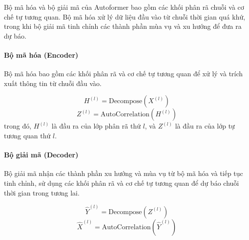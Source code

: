 Bộ mã hóa và bộ giải mã của Autoformer bao gồm các khối phân rã chuỗi và cơ chế tự tương quan. Bộ mã hóa xử lý dữ liệu đầu vào từ chuỗi thời gian quá khứ, trong khi bộ giải mã tinh chỉnh các thành phần mùa vụ và xu hướng để đưa ra dự báo.

\paragraph{Bộ mã hóa (Encoder)}

Bộ mã hóa bao gồm các khối phân rã và cơ chế tự tương quan để xử lý và trích xuất thông tin từ chuỗi đầu vào.

\[
H^{(l)} = \text{Decompose}(X^{(l)})
\]
\[
Z^{(l)} = \text{AutoCorrelation}(H^{(l)})
\]
trong đó, $H^{(l)}$ là đầu ra của lớp phân rã thứ $l$, và $Z^{(l)}$ là đầu ra của lớp tự tương quan thứ $l$.

\paragraph{Bộ giải mã (Decoder)}

Bộ giải mã nhận các thành phần xu hướng và mùa vụ từ bộ mã hóa và tiếp tục tinh chỉnh, sử dụng các khối phân rã và cơ chế tự tương quan để dự báo chuỗi thời gian trong tương lai.

\[
\hat{Y}^{(l)} = \text{Decompose}(Z^{(l)})
\]
\[
\hat{X}^{(l)} = \text{AutoCorrelation}(\hat{Y}^{(l)})
\]
